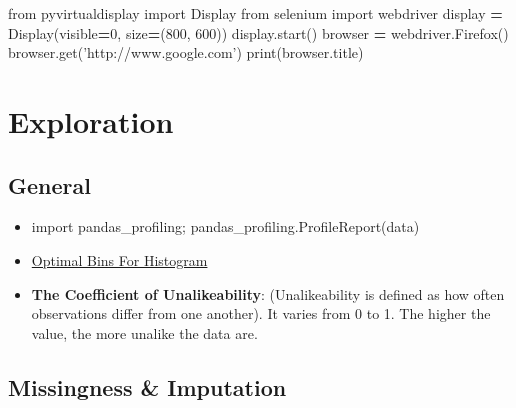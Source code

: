 \documentclass[]{book}
\newenvironment{Shaded}{\begin{snugshade}}{\end{snugshade}}
\newcommand{\DecValTok}[1]{\textcolor[rgb]{0.00,0.00,0.81}{#1}}
\newcommand{\StringTok}[1]{\textcolor[rgb]{0.31,0.60,0.02}{#1}}
\newcommand{\ImportTok}[1]{#1}
\newcommand{\OperatorTok}[1]{\textcolor[rgb]{0.81,0.36,0.00}{\textbf{#1}}}
\newcommand{\BuiltInTok}[1]{#1}
\newcommand{\NormalTok}[1]{#1}
\theoremstyle{definition}
\theoremstyle{definition}
\theoremstyle{definition}
\theoremstyle{remark}
\begin{document}
\begin{Shaded}
\begin{Highlighting}[]
\ImportTok{from}\NormalTok{ pyvirtualdisplay }\ImportTok{import}\NormalTok{ Display  }
\ImportTok{from}\NormalTok{ selenium }\ImportTok{import}\NormalTok{ webdriver  }
\NormalTok{display }\OperatorTok{=}\NormalTok{ Display(visible}\OperatorTok{=}\DecValTok{0}\NormalTok{, size}\OperatorTok{=}\NormalTok{(}\DecValTok{800}\NormalTok{, }\DecValTok{600}\NormalTok{))  }
\NormalTok{display.start()  }
\NormalTok{browser }\OperatorTok{=}\NormalTok{ webdriver.Firefox()  }
\NormalTok{browser.get(}\StringTok{'http://www.google.com'}\NormalTok{)  }
\BuiltInTok{print}\NormalTok{(browser.title)}
\end{Highlighting}
\end{Shaded}

\section{Exploration}\label{exploration}

\subsection{General}\label{general-1}

\begin{itemize}
\item
  import pandas\_profiling; pandas\_profiling.ProfileReport(data)
\item
  \href{https://stats.stackexchange.com/questions/798/calculating-optimal-number-of-bins-in-a-histogram/862\#862}{Optimal
  Bins For Histogram}
\item
  \textbf{The Coefficient of Unalikeability}: (Unalikeability is defined
  as how often observations differ from one another). It varies from 0
  to 1. The higher the value, the more unalike the data are.
\end{itemize}

\subsection{Missingness \& Imputation}\label{missingness-imputation}
\end{document}
